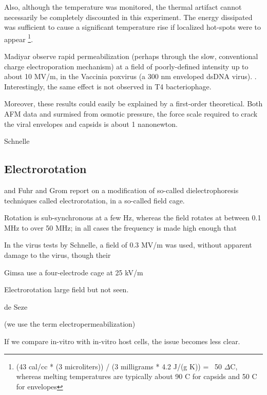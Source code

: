 \documentclass[paper.tex]{subfiles}
\begin{document}
\begin{multicols}{1}
Also, although the temperature was monitored, the thermal artifact cannot necessarily be completely discounted in this experiment. The energy dissipated was sufficient to cause a significant temperature rise if localized hot-spots were to appear \footnote{(43 cal/cc * (3 microliters)) / (3 milligrams * 4.2 J/(g K)) = ~50 $\Delta$C, whereas melting temperatures are typically about 90 C for capsids \cite{Thermal1999} and 50 C for envelopes\cite{Stability1985}}.


Madiyar \cite{Manipulation2013} observe rapid permeabilization (perhaps through the slow, conventional charge electroporation mechanism) at a field of poorly-defined intensity up to about 10 MV/m, in the Vaccinia poxvirus (a 300 nm enveloped dsDNA virus). \cite{AC2017}. Interestingly, the same effect is not observed in T4 bacteriophage. 

Moreover, these results could easily be explained by a first-order theoretical. Both AFM data and surmised from osmotic pressure, the force scale required to crack the viral envelopes and capsids is about 1 nanonewton. 

Schnelle\cite{Trapping1996} 

\subsection{Electrorotation}

and Fuhr\cite{Radiofrequency1994} and Grom \cite{Accumulation2006} report on a modification of so-called dielectrophoresis techniques called electrorotation, in a so-called field cage.
 
 
 
Rotation is sub-synchronous at a few Hz, whereas the field rotates at between 0.1 MHz to over 50 MHz; in all cases the frequency is made high enough that 

In the virus tests by Schnelle, a field of 0.3 MV/m was used, without apparent damage to the virus, though their 

Gimsa \cite{New1999} use a four-electrode cage at 25 kV/m 


Electrorotation large field but not seen.

de Seze





\pagebreak

(we use the term electropermeabilization)


If we compare in-vitro with in-vitro host cells, the issue becomes less clear.



\end{multicols}
\end{document}
